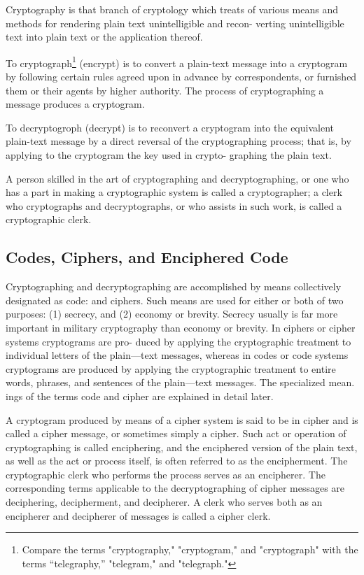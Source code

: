 \mypara Cryptography is that branch of cryptology which treats of various
means and methods for rendering plain text unintelligible and recon-
verting unintelligible text into plain text or the application thereof.

\mypara To cryptograph\footnote{ Compare the terms "cryptography," "cryptogram," and "cryptograph" with the terms “telegraphy,” "telegram," and "telegraph."} (encrypt) is to convert a plain-text message into
a cryptogram by following certain rules agreed upon in advance by
correspondents, or furnished them or their agents by higher authority.
The process of cryptographing a message produces a cryptogram.

\mypara To decryptogroph (decrypt) is to reconvert a cryptogram into the
equivalent plain-text message by a direct reversal of the cryptographing
process; that is, by applying to the cryptogram the key used in crypto-
graphing the plain text.

\mypara A person skilled in the art of cryptographing and decryptographing,
or one who has a part in making a cryptographic system is called a
cryptographer; a clerk who cryptographs and decryptographs, or who
assists in such work, is called a cryptographic clerk.

\subsection{Codes, Ciphers, and Enciphered Code}

\mypara Cryptographing and decryptographing are accomplished by means
collectively designated as code: and ciphers. Such means are used for
either or both of two purposes: (1) secrecy, and (2) economy or brevity.
Secrecy usually is far more important in military cryptography than
economy or brevity. In ciphers or cipher systems cryptograms are pro-
duced by applying the cryptographic treatment to individual letters of
the plain—text messages, whereas in codes or code systems cryptograms
are produced by applying the cryptographic treatment to entire words,
phrases, and sentences of the plain—text messages. The specialized mean.
ings of the terms code and cipher are explained in detail later.

\mypara A cryptogram produced by means of a cipher system is said to be
in cipher and is called a cipher message, or sometimes simply a cipher.
Such act or operation of cryptographing is called enciphering, and the
enciphered version of the plain text, as well as the act or process itself,
is often referred to as the encipherment. The cryptographic clerk who
performs the process serves as an encipherer. The corresponding terms
applicable to the decryptographing of cipher messages are deciphering,
decipherment, and decipherer. A clerk who serves both as an encipherer
and decipherer of messages is called a cipher clerk.

